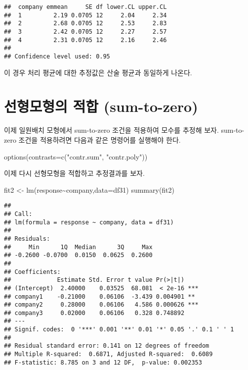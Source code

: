 \documentclass[
]{book}
\newenvironment{Shaded}{\begin{snugshade}}{\end{snugshade}}
\newcommand{\AttributeTok}[1]{\textcolor[rgb]{0.77,0.63,0.00}{#1}}
\newcommand{\FunctionTok}[1]{\textcolor[rgb]{0.00,0.00,0.00}{#1}}
\newcommand{\NormalTok}[1]{#1}
\newcommand{\OtherTok}[1]{\textcolor[rgb]{0.56,0.35,0.01}{#1}}
\newcommand{\SpecialCharTok}[1]{\textcolor[rgb]{0.00,0.00,0.00}{#1}}
\newcommand{\StringTok}[1]{\textcolor[rgb]{0.31,0.60,0.02}{#1}}
\begin{document}
\begin{verbatim}
##  company emmean     SE df lower.CL upper.CL
##  1         2.19 0.0705 12     2.04     2.34
##  2         2.68 0.0705 12     2.53     2.83
##  3         2.42 0.0705 12     2.27     2.57
##  4         2.31 0.0705 12     2.16     2.46
## 
## Confidence level used: 0.95
\end{verbatim}

이 경우 처리 평균에 대한 추정값은 산술 평균과 동일하게 나온다.

\hypertarget{uxc120uxd615uxbaa8uxd615uxc758-uxc801uxd569-sum-to-zero}{%
\section{선형모형의 적합 (sum-to-zero)}\label{uxc120uxd615uxbaa8uxd615uxc758-uxc801uxd569-sum-to-zero}}

이제 일원배치 모형에서 sum-to-zero 조건을 적용하여 모수를 추정해 보자.
sum-to-zero 조건을 적용하려면 다음과 같은 명령어를 실행해야 한다.

\begin{Shaded}
\begin{Highlighting}[]
\FunctionTok{options}\NormalTok{(}\AttributeTok{contrasts=}\FunctionTok{c}\NormalTok{(}\StringTok{"contr.sum"}\NormalTok{, }\StringTok{"contr.poly"}\NormalTok{))}
\end{Highlighting}
\end{Shaded}

이제 다시 선형모형을 적합하고 추정결과를 보자.

\begin{Shaded}
\begin{Highlighting}[]
\NormalTok{fit2 }\OtherTok{\textless{}{-}} \FunctionTok{lm}\NormalTok{(response}\SpecialCharTok{\textasciitilde{}}\NormalTok{company,}\AttributeTok{data=}\NormalTok{df31)}
\FunctionTok{summary}\NormalTok{(fit2)}
\end{Highlighting}
\end{Shaded}

\begin{verbatim}
## 
## Call:
## lm(formula = response ~ company, data = df31)
## 
## Residuals:
##     Min      1Q  Median      3Q     Max 
## -0.2600 -0.0700  0.0150  0.0625  0.2600 
## 
## Coefficients:
##             Estimate Std. Error t value Pr(>|t|)    
## (Intercept)  2.40000    0.03525  68.081  < 2e-16 ***
## company1    -0.21000    0.06106  -3.439 0.004901 ** 
## company2     0.28000    0.06106   4.586 0.000626 ***
## company3     0.02000    0.06106   0.328 0.748892    
## ---
## Signif. codes:  0 '***' 0.001 '**' 0.01 '*' 0.05 '.' 0.1 ' ' 1
## 
## Residual standard error: 0.141 on 12 degrees of freedom
## Multiple R-squared:  0.6871, Adjusted R-squared:  0.6089 
## F-statistic: 8.785 on 3 and 12 DF,  p-value: 0.002353
\end{verbatim}
\end{document}

